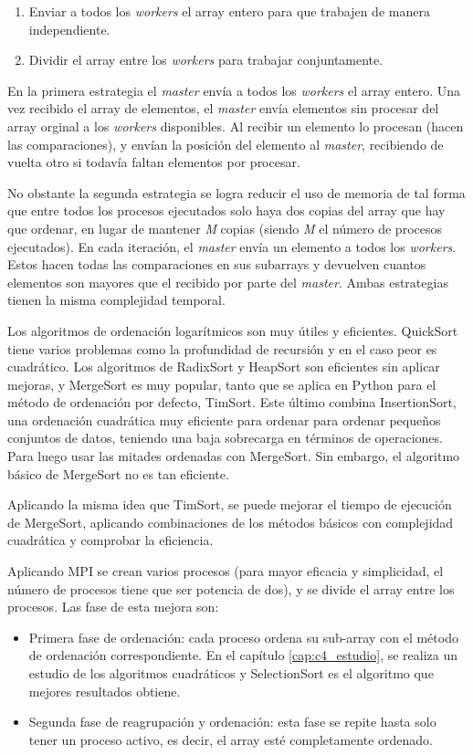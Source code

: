 	\begin{enumerate}
		\item Enviar a todos los \textit{workers} el array entero para que trabajen de manera independiente.
		\item Dividir el array entre los \textit{workers} para trabajar conjuntamente.
	\end{enumerate}
	
	En la primera estrategia el \textit{master} envía a todos los \textit{workers} el array entero. Una vez recibido el array de elementos, el \textit{master} envía elementos sin procesar del array orginal a los \textit{workers} disponibles. Al recibir un elemento lo procesan (hacen las comparaciones), y envían la posición del elemento al \textit{master}, recibiendo de vuelta otro si todavía faltan elementos por procesar. 
	
	No obstante la segunda estrategia se logra reducir el uso de memoria de tal forma que entre todos los procesos ejecutados solo haya dos copias del array que hay que ordenar, en lugar de mantener \textit{M} copias (siendo \textit{M} el número de procesos ejecutados). En cada iteración, el \textit{master} envía un elemento a todos los \textit{workers}. Estos hacen todas las comparaciones en sus subarrays y devuelven cuantos elementos son mayores que el recibido por parte del \textit{master}. Ambas estrategias tienen la misma complejidad temporal.



	Los algoritmos de ordenación logarítmicos son muy útiles y eficientes. QuickSort tiene varios problemas como la profundidad de recursión y en el caso peor es cuadrático. Los algoritmos de RadixSort y HeapSort son eficientes sin aplicar mejoras, y MergeSort es muy popular, tanto que se aplica en Python para el método de ordenación por defecto, TimSort\cite{auger2015merge}. Este último combina InsertionSort, una ordenación cuadrática muy eficiente para ordenar para ordenar pequeños conjuntos de datos, teniendo una baja sobrecarga en términos de operaciones. Para luego usar las mitades ordenadas con MergeSort. Sin embargo, el algoritmo básico de MergeSort no es tan eficiente.
	
	Aplicando la misma idea que TimSort, se puede mejorar el tiempo de ejecución de MergeSort, aplicando combinaciones de los métodos básicos con complejidad cuadrática y comprobar la eficiencia.
	
	
	Aplicando MPI se crean varios procesos (para mayor eficacia y simplicidad, el número de procesos tiene que ser potencia de dos), y se divide el array entre los procesos. Las fase de esta mejora son:
	\begin{itemize}
		\item Primera fase de ordenación: cada proceso ordena su sub-array con el método de ordenación correspondiente. En el capítulo \ref{cap:c4_estudio}, se realiza un estudio de los algoritmos cuadráticos y SelectionSort es el algoritmo que mejores resultados obtiene.
		\item Segunda fase de reagrupación y ordenación: esta fase se repite hasta solo tener un proceso activo, es decir, el array esté completamente ordenado.
	\end{itemize}
	
